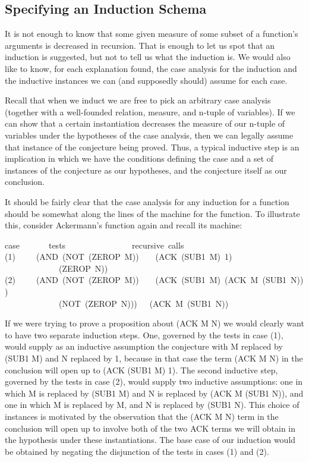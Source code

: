 \documentclass[11pt]{book}
\newenvironment{pubasis}{\begin{flushleft}\ttfamily\small}{\normalsize\rmfamily\end{flushleft}}
\newcommand{\pubdefaulttextsize}{\large}
\begin{document}
\subsection{Specifying an Induction Schema}
\pubdefaulttextsize
It is not enough to know that some given measure of some subset of
a function's arguments is decreased in recursion.
That is enough to let us spot that an induction is suggested, but not
to tell us what the induction is.  We would also like to know, for each
explanation found, the case analysis for the induction and the inductive
instances we can (and supposedly should) assume for each case.

Recall that when we induct we are free to pick an
arbitrary case analysis (together with a well-founded relation, measure,
and n-tuple of variables).  If we can show that a certain instantiation
decreases the measure of our n-tuple of variables under the hypotheses of
the case analysis, then we can legally assume that instance of the
conjecture being proved.  Thus, a typical inductive step
is an implication in which we have the conditions defining the
case and a set of instances of the conjecture as our hypotheses, and
the conjecture itself as our conclusion.

It should be fairly clear that the case analysis for any induction for
a function should be somewhat along the lines of the machine for the
function.  To illustrate this, consider Ackermann's function again and recall
its machine:
\begin{pubasis}
case~~~~~~~tests~~~~~~~~~~~~~~~~recursive~calls\\

(1)~~~~~(AND~(NOT~(ZEROP~M))~~~~(ACK~(SUB1~M)~1)\\
~~~~~~~~~~~~~(ZEROP~N))\\

(2)~~~~~(AND~(NOT~(ZEROP~M))~~~~(ACK~(SUB1~M)~(ACK~M~(SUB1~N)))\\
~~~~~~~~~~~~~(NOT~(ZEROP~N)))~~~(ACK~M~(SUB1~N))\\
\end{pubasis}
If we were trying to prove a proposition about (ACK M N) we would
clearly want to have two separate induction steps.  One, governed
by the tests in case (1), would supply as an inductive assumption
the conjecture with M replaced by (SUB1 M) and N replaced by 1,
because in that case the term (ACK M N) in the conclusion will open up
to (ACK (SUB1 M) 1).  The second inductive step, governed by the
tests in case (2), would supply two inductive assumptions:
one in which M is replaced by (SUB1 M) and N is replaced by (ACK M (SUB1 N)),
and one in which M is replaced by M, and N is replaced by (SUB1 N).  This choice
of instances is motivated by the observation that
the (ACK M N) term in the conclusion will open up to involve both of
the two ACK terms we will obtain in the hypothesis under these
instantiations.  The base case of our induction would be obtained by negating the disjunction
of the tests in cases (1) and (2).
\end{document}
